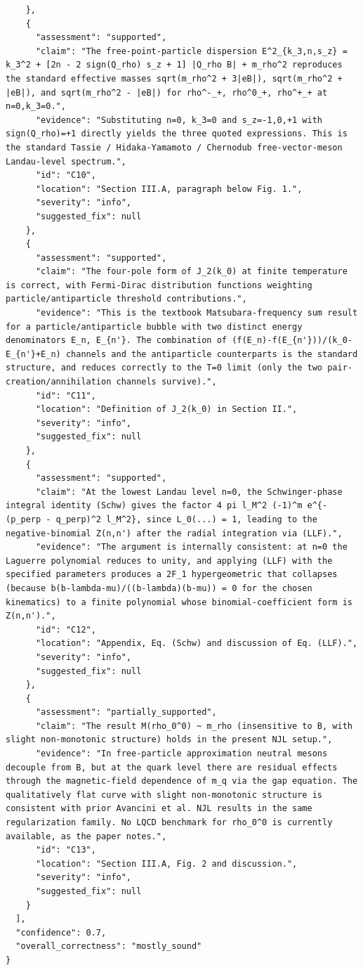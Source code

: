 \documentclass[11pt]{article}
\begin{document}
\begin{verbatim}
    },
    {
      "assessment": "supported",
      "claim": "The free-point-particle dispersion E^2_{k_3,n,s_z} = k_3^2 + [2n - 2 sign(Q_rho) s_z + 1] |Q_rho B| + m_rho^2 reproduces the standard effective masses sqrt(m_rho^2 + 3|eB|), sqrt(m_rho^2 + |eB|), and sqrt(m_rho^2 - |eB|) for rho^-_+, rho^0_+, rho^+_+ at n=0,k_3=0.",
      "evidence": "Substituting n=0, k_3=0 and s_z=-1,0,+1 with sign(Q_rho)=+1 directly yields the three quoted expressions. This is the standard Tassie / Hidaka-Yamamoto / Chernodub free-vector-meson Landau-level spectrum.",
      "id": "C10",
      "location": "Section III.A, paragraph below Fig. 1.",
      "severity": "info",
      "suggested_fix": null
    },
    {
      "assessment": "supported",
      "claim": "The four-pole form of J_2(k_0) at finite temperature is correct, with Fermi-Dirac distribution functions weighting particle/antiparticle threshold contributions.",
      "evidence": "This is the textbook Matsubara-frequency sum result for a particle/antiparticle bubble with two distinct energy denominators E_n, E_{n'}. The combination of (f(E_n)-f(E_{n'}))/(k_0-E_{n'}+E_n) channels and the antiparticle counterparts is the standard structure, and reduces correctly to the T=0 limit (only the two pair-creation/annihilation channels survive).",
      "id": "C11",
      "location": "Definition of J_2(k_0) in Section II.",
      "severity": "info",
      "suggested_fix": null
    },
    {
      "assessment": "supported",
      "claim": "At the lowest Landau level n=0, the Schwinger-phase integral identity (Schw) gives the factor 4 pi l_M^2 (-1)^m e^{-(p_perp - q_perp)^2 l_M^2}, since L_0(...) = 1, leading to the negative-binomial Z(n,n') after the radial integration via (LLF).",
      "evidence": "The argument is internally consistent: at n=0 the Laguerre polynomial reduces to unity, and applying (LLF) with the specified parameters produces a 2F_1 hypergeometric that collapses (because b(b-lambda-mu)/((b-lambda)(b-mu)) = 0 for the chosen kinematics) to a finite polynomial whose binomial-coefficient form is Z(n,n').",
      "id": "C12",
      "location": "Appendix, Eq. (Schw) and discussion of Eq. (LLF).",
      "severity": "info",
      "suggested_fix": null
    },
    {
      "assessment": "partially_supported",
      "claim": "The result M(rho_0^0) ~ m_rho (insensitive to B, with slight non-monotonic structure) holds in the present NJL setup.",
      "evidence": "In free-particle approximation neutral mesons decouple from B, but at the quark level there are residual effects through the magnetic-field dependence of m_q via the gap equation. The qualitatively flat curve with slight non-monotonic structure is consistent with prior Avancini et al. NJL results in the same regularization family. No LQCD benchmark for rho_0^0 is currently available, as the paper notes.",
      "id": "C13",
      "location": "Section III.A, Fig. 2 and discussion.",
      "severity": "info",
      "suggested_fix": null
    }
  ],
  "confidence": 0.7,
  "overall_correctness": "mostly_sound"
}
\end{verbatim}
\end{document}
